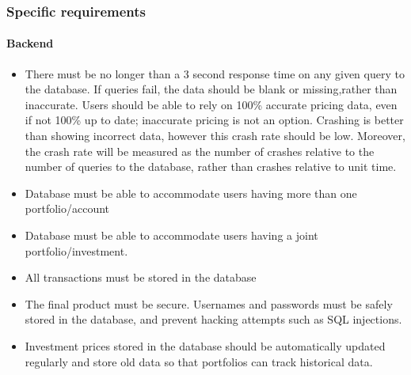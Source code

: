 \documentclass[onecolumn, draftclsnofoot,10pt, compsoc]{IEEEtran}
\begin{document}
\subsubsection{Specific requirements}

\paragraph{Backend}

\begin{itemize}
\item There must be no longer than a 3 second response time on any given query to the database. If queries fail, the data should be blank or missing,rather than inaccurate. Users should be able to rely on 100\% accurate pricing data, even if not 100\% up to date; inaccurate pricing is not an option. Crashing is better than showing incorrect data, however this crash rate should be low. Moreover, the crash rate will be measured as the number of crashes relative to the number of queries to the database, rather than crashes relative to unit time.

\item Database must be able to accommodate users having more than one portfolio/account
\item Database must be able to accommodate users having a joint portfolio/investment.
\item All transactions must be stored in the database
\item The final product must be secure. Usernames and passwords must be safely stored in the database, and prevent hacking attempts such as SQL injections. 
\item Investment prices stored in the database should be automatically updated regularly and store old data so that portfolios can track historical data. 
\end{itemize}
\end{document}

